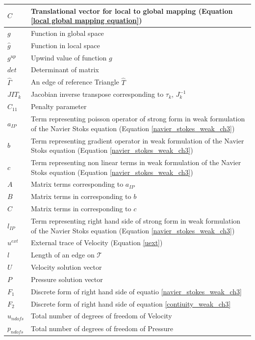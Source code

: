 \documentclass[a4paper]{book}
\begin{document}
\begin{longtable}{| p{} | p{} |}
\hline
$C$ & Translational vector for local to global mapping (Equation \ref{local global mapping equation})\\
\hline
$g$ & Function in global space \\
\hline
$\hat{g}$ & Function in local space \\
\hline
$g^{up}$ & Upwind value of function $g$\\
\hline
$det$ & Determinant of matrix \\
\hline
$\hat{\Gamma}$ & An edge of reference Triangle $\hat{T}$\\
\hline
$JIT_k$ & Jacobian inverse transpose corresponding to $\tau_k$, $J_k^{-1}$\\
\hline
$C_{11}$ & Penalty parameter \\
\hline
$a_{IP}$ & Term representing poisson operator of strong form in weak formulation of the Navier Stoks equation (Equation \eqref{navier_stokes_weak_ch3}) \\
\hline
$b$ & Term representing gradient operator in weak formulation of the Navier Stoks equation (Equation \eqref{navier_stokes_weak_ch3})\\
\hline
$c$ & Term representing non linear terms in weak formulation of the Navier Stoks equation (Equation \eqref{navier_stokes_weak_ch3})\\
\hline
$A$ & Matrix terms corresponding to $a_{IP}$\\
\hline
$B$ & Matrix terms in corresponding to $b$\\
\hline
$C$ & Matrix terms in corresponding to $c$\\
\hline
$l_{IP}$ & Term representing right hand side of strong form in weak formulation of the Navier Stoks equation (Equation \eqref{navier_stokes_weak_ch3}) \\
\hline
$u^{ext}$ & External trace of Velocity (Equation \ref{uext})\\
\hline
$l$ & Length of an edge on $\mathcal{T}$\\
\hline
$U$ & Velocity solution vector \\
\hline
$P$ & Pressure solution vector\\
\hline
$F_1$ & Discrete form of right hand side of equatio \eqref{navier_stokes_weak_ch3}\\
\hline
$F_2$ & Discrete form of right hand side of equation \eqref{contiuity_weak_ch3}\\
\hline
$u_{ndofs}$ & Total number of degrees of freedom of Velocity\\
\hline
$p_{ndofs}$ & Total number of degrees of freedom of Pressure\\

\end{longtable}
\end{document}
